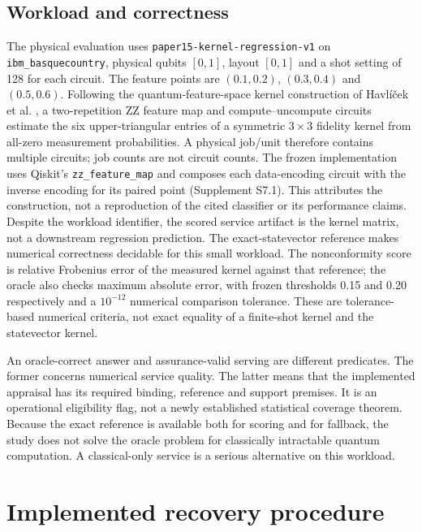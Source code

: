 \documentclass[pdflatex,sn-mathphys-num]{sn-jnl}
\newcommand{\code}[1]{\texttt{\small #1}}
\begin{document}
\subsection{Workload and correctness}
The physical evaluation uses \code{paper15-kernel-regression-v1} on \code{ibm\_basquecountry}, physical qubits $[0,1]$, layout $[0,1]$ and a shot setting of 128 for each circuit. The feature points are $(0.1,0.2)$, $(0.3,0.4)$ and $(0.5,0.6)$. Following the quantum-feature-space kernel construction of Havl{\'i}{\v{c}}ek et al. \cite{havlicek2019supervised}, a two-repetition ZZ feature map and compute--uncompute circuits estimate the six upper-triangular entries of a symmetric $3\times3$ fidelity kernel from all-zero measurement probabilities. A physical job/unit therefore contains multiple circuits; job counts are not circuit counts. The frozen implementation uses Qiskit's \texttt{zz\_feature\_map} and composes each data-encoding circuit with the inverse encoding for its paired point (Supplement S7.1). This attributes the construction, not a reproduction of the cited classifier or its performance claims. Despite the workload identifier, the scored service artifact is the kernel matrix, not a downstream regression prediction. The exact-statevector reference makes numerical correctness decidable for this small workload. The nonconformity score is relative Frobenius error of the measured kernel against that reference; the oracle also checks maximum absolute error, with frozen thresholds 0.15 and 0.20 respectively and a $10^{-12}$ numerical comparison tolerance. These are tolerance-based numerical criteria, not exact equality of a finite-shot kernel and the statevector kernel.

An oracle-correct answer and assurance-valid serving are different predicates. The former concerns numerical service quality. The latter means that the implemented appraisal has its required binding, reference and support premises. It is an operational eligibility flag, not a newly established statistical coverage theorem. Because the exact reference is available both for scoring and for fallback, the study does not solve the oracle problem for classically intractable quantum computation. A classical-only service is a serious alternative on this workload.

\section{Implemented recovery procedure}
\end{document}
